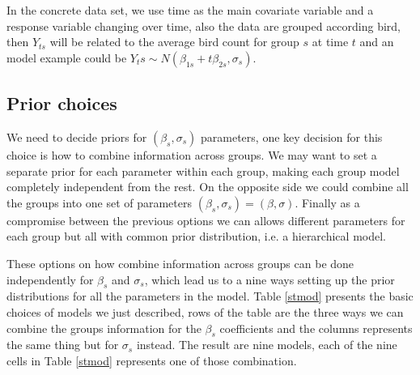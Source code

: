 \documentclass{article}
\begin{document}
In the concrete data set, we use time as the main covariate variable and a response variable changing over time, also the data are grouped according bird, then $Y_{ts}$ will be related to the average bird count for group $s$ at time $t$ and an model example could be $Y_ts \sim N(\beta_{1s} + t\beta_{2s}, \sigma_s)$. 

\subsection{Prior choices}
We need to decide priors for $(\beta_s, \sigma_s)$ parameters, one key decision for this choice is how to combine information across groups. We may want to set a separate prior for each parameter within each group, making each group model completely independent from the rest. On the opposite side we could combine all the groups into one set of parameters $(\beta_s, \sigma_s) = (\beta, \sigma)$. Finally as a compromise between the previous options we can allows different parameters for each group but all with common prior distribution, i.e. a hierarchical model. 

These options on how combine information across groups can be done independently for $\beta_s$ and $\sigma_s$, which lead us to a nine ways setting up the prior distributions for all the parameters in the model. Table \ref{stmod} presents the basic choices of models we just described, rows of the table are the three ways we can combine the groups information for the $\beta_s$ coefficients and the columns represents the same thing but for $\sigma_s$ instead. The result are nine models, each of the nine cells in Table \ref{stmod} represents one of those combination. 
 
\end{document}
